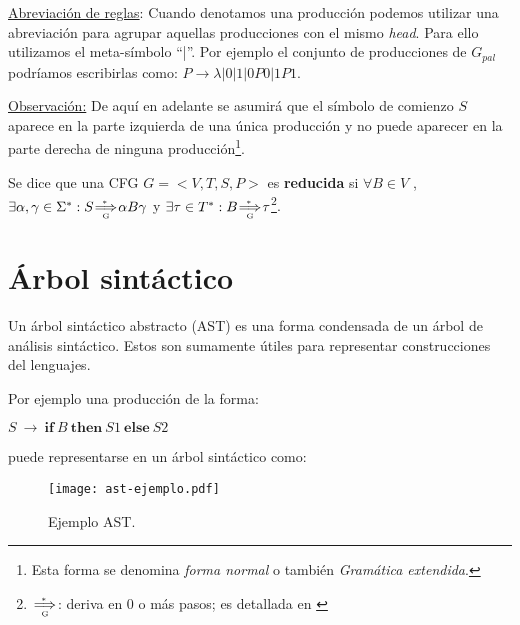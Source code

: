 \underline{Abreviación de reglas}: Cuando denotamos una producción podemos utilizar una abreviación para agrupar aquellas producciones con el mismo \textit{head}. Para ello utilizamos el meta-símbolo ``|''. Por ejemplo el conjunto de producciones de $G_{pal}$ podríamos escribirlas como: $P \rightarrow \lambda | 0 | 1 | 0P0 | 1P1$.

\underline{Observación:}
De aquí en adelante se asumirá que el símbolo de comienzo $S$  aparece en la parte izquierda de una única producción y no puede aparecer en la parte derecha de ninguna producción\footnote{Esta forma se denomina \emph{forma normal} o también \textit{Gramática extendida}.}. \\

\begin{definition} Se dice que una CFG $G=<V,T,S,P>$
es \textbf{reducida} si
$\forall B \in V$ , $\exists \alpha , \gamma \in \Sigma^{*} : S \clausderiva{G} \alpha B \gamma$ y $\exists \tau \in T^{*} : B \clausderiva{G} \tau$\footnote{ $\clausderiva{G}$: deriva en 0 o más pasos; es detallada en \cite{tesismarcelo}}.
\label{def:reducida}
\end{definition}

\section{Árbol sintáctico}

Un árbol sintáctico abstracto (AST) es una forma condensada de un árbol de análisis sintáctico. Estos son sumamente útiles para representar construcciones del lenguajes.

Por ejemplo una producción de la forma:
\begin{center}\large
$S\ \rightarrow\ \textbf{if}\ B\ \textbf{then}\ S1\ \textbf{else}\ S2$                                                                      \end{center}
puede representarse en un árbol sintáctico como:

\begin{figure}[h!]\centering
\texttt{[image: ast-ejemplo.pdf]}
\caption{\label{ejem-ast} Ejemplo AST.}
\end{figure}

